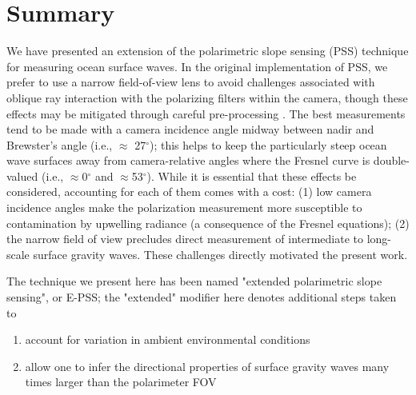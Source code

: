 \documentclass[letterpaper,draftcls,onecolumn]{IEEEtran}
\begin{document}


\section{Summary}
\label{sec:summary}

We have presented an extension of the polarimetric slope sensing (PSS) technique for measuring ocean surface waves. In the original implementation of PSS, we prefer to use a narrow field-of-view lens to avoid challenges associated with oblique ray interaction with the polarizing filters within the camera, though these effects may be mitigated through careful pre-processing \cite{pistellato_geometric_2024}. The best measurements tend to be made with a camera incidence angle midway between nadir and Brewster's angle (i.e., $\approx$ 27$^{\circ}$); this helps to keep the particularly steep ocean wave surfaces away from camera-relative angles where the Fresnel curve is double-valued (i.e., $\approx$0$^{\circ}$ and $\approx$53$^{\circ}$). While it is essential that these effects be considered, accounting for each of them comes with a cost: (1) low camera incidence angles make the polarization measurement more susceptible to contamination by upwelling radiance (a consequence of the Fresnel equations); (2) the narrow field of view precludes direct measurement of intermediate to long-scale surface gravity waves. These challenges directly motivated the present work.


The technique we present here has been named "extended polarimetric slope sensing", or E-PSS; the "extended" modifier here denotes additional steps taken to 

\begin{enumerate}
	\item account for variation in ambient environmental conditions
	\item allow one to infer the directional properties of surface gravity waves many times larger than the polarimeter FOV
\end{enumerate}
\end{document}
